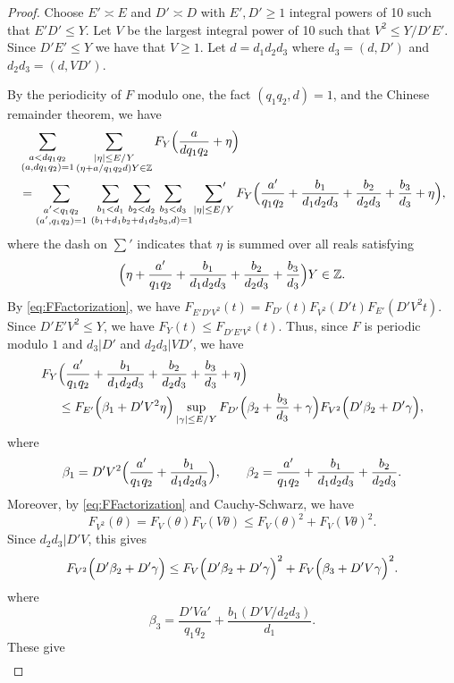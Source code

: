 \documentclass[10pt]{amsart}
\theoremstyle{plain}
\numberwithin{sblmm}{thrm}
\numberwithin{equation}{section}
\begin{document}
\begin{proof}
%
Choose $E'\asymp E$ and $D'\asymp D$ with $E',D'\ge 1$ integral powers of 10 such that $E' D'\le Y$. Let $V$ be the largest integral power of 10 such that $V^2\le Y/D' E'$. Since $D' E'\le Y$ we have that $V\ge1$. Let $d=d_1d_2d_3$ where $d_3=(d,D')$ and $d_2d_3=(d,VD')$.

By the periodicity of $F$ modulo one, the fact $(q_1q_2,d)=1$, and the Chinese remainder theorem, we have
%
\begin{align}
&\sum_{\substack{a< d q_1q_2\\ (a,d q_1q_2)=1}}\sum_{\substack{|\eta|\le E/Y\\ (\eta+a/q_1q_2d)Y\in\mathbb{Z}}}F_Y\Bigl(\frac{a}{d q_1 q_2}+\eta\Bigr)\nonumber\\
&=\sum_{\substack{a'< q_1q_2\\ (a',q_1q_2)=1}}\,\underset{(b_1+d_1b_2+d_1d_2b_3,d)=1}{\sum_{b_1< d_1}\,\sum_{b_2< d_2}\,\sum_{b_3< d_3}}\,\sideset{}{'}\sum_{|\eta|\le E/Y}F_Y\Bigl(\frac{a'}{q_1q_2}+\frac{b_1}{d_1d_2d_3}+\frac{b_2}{d_2d_3}+\frac{b_3}{d_3}+\eta\Bigr),\label{eq:FirstSplit}
\end{align}
where the dash on $\sum'$ indicates that $\eta$ is summed over all reals satisfying
\[
\Bigl(\eta+\frac{a'}{ q_1q_2}+\frac{b_1}{d_1d_2d_3}+\frac{b_2}{d_2d_3}+\frac{b_3}{d_3}\Bigr)Y\in\mathbb{Z}.
\]
%
By \eqref{eq:FFactorization}, we have $F_{E' D' V^2}(t)=F_{D'}(t)F_{V^2}(D' t)F_{E'}(D' V^2t)$. Since $D' E' V^2\le Y$, we have $F_Y(t)\le F_{D' E' V^2}(t)$. Thus, since $F$ is periodic modulo $1$ and $d_3|D'$ and $d_2d_3|VD'$, we have
%
\begin{align*}
F_{Y}&\Bigl(\frac{a'}{q_1q_2}+\frac{b_1}{d_1d_2d_3}+\frac{b_2}{d_2d_3}+\frac{b_3}{d_3}+\eta\Bigr)\\
&\le F_{E'}\Bigl(\beta_1+D' V^2\eta\Bigr)\sup_{|\gamma|\le E/Y}F_{D'}\Bigl(\beta_2+\frac{b_3}{d_3}+\gamma\Bigr)F_{V^2}\Bigl(D'\beta_2+D' \gamma\Bigr),
%
\end{align*}
where
\[
\beta_1=D' V^2\Bigl(\frac{a'}{q_1q_2}+\frac{b_1}{d_1d_2d_3}\Bigr),\qquad \beta_2=\frac{a'}{q_1q_2}+\frac{b_1}{d_1d_2d_3}+\frac{b_2}{d_2d_3}.
\]
Moreover, by \eqref{eq:FFactorization} and Cauchy-Schwarz, we have
\[
F_{V^2}(\theta)=F_V(\theta)F_V(V\theta)\le F_V(\theta)^2+F_V(V\theta)^2.
\]
Since $d_2d_3|D' V$, this gives
\[
F_{V^2}\Bigl(D'\beta_2+D' \gamma\Bigr)\le F_V\Bigl(D'\beta_2+D' \gamma\Bigr)^2+F_V\Big(\beta_3+D' V\gamma\Bigr)^2.
\]
where
\[
\beta_3=\frac{D' V a'}{q_1q_2}+\frac{b_1(D' V/d_2d_3)}{d_1}.
\]
These give
\begin{align*}

\end{align*}
\end{proof}
\end{document}
